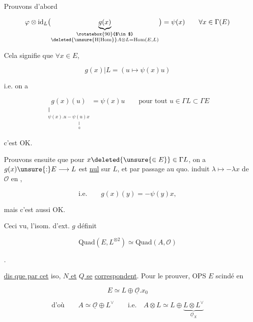 


Prouvons d'abord

\[
\varphi\otimes\mathrm{id}_{L}\bigl(\underbrace{g(x)}_{\substack{\rotatebox{90}{$\in$}\\ \deleted{\unsure{\mathrm{H}|\mathrm{Hom}}}A\otimes L=\mathrm{Hom}(E,L)}}\bigr)=\psi(x)
\qquad \forall x\in\Gamma(E)
\]

Cela signifie que $\forall x\in E$,

\[
g(x)|L=(u\longmapsto\psi(x)u)
\]

 i.e. on a

\[
\underset{\substack{\Vert\\ \psi(x).u-\underset{\substack{\Vert\\0}}{\psi(u)}x}}{g(x)(u)}
=\psi(x)u\qquad\text{pour tout }u\in\Gamma L\subset\Gamma E
\]

c'est OK.

Prouvons ensuite que pour $x\deleted{\unsure{\in E}}\in\Gamma L$, on a $g(x)\unsure{:}E\longrightarrow L$ est \uline{nul} sur $L$, et par passage au quo. induit $\lambda\longmapsto-\lambda x$ de $\mathcal O$ en ,


\[
\text{i.e.}\qquad g(x)(y)=-\psi(y)x,
\]

mais c'est aussi OK.

Ceci vu, l'isom. d'ext. $g$ définit

\[
\mathrm{Quad}(E,L^{\otimes2})\simeq\mathrm{Quad}(A,\mathcal O)
\]

.

\uline{dis que  par cet} iso, \uline{$N$ et} \uline{$Q$ se} \uline{correspondent}. Pour le prouver, OPS $E$ scindé en

\[
E\simeq L\oplus\underline{\mathcal O}.x_0
\]

\[
\text{d'où}\qquad A\simeq\underline{\mathcal O}\oplus L^\vee \qquad
\text{i.e.}\quad A\otimes L\simeq L\oplus
\underbrace{L\otimes L^\vee}_{\underline{\mathcal O}_X}
\]


